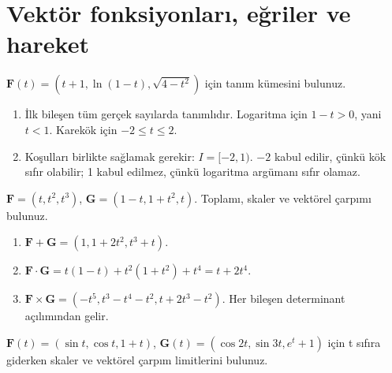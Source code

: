 \clearpage\section{Vektör fonksiyonları, eğriler ve hareket}
\begin{tcolorbox}[title={Örnek 3.1 | Defterdeki tanım kümesi örneği},colframe=accent]\(\mathbf F(t)=(t+1,\ln(1-t),\sqrt{4-t^2})\) için tanım kümesini bulunuz.
\par{}\end{tcolorbox}
\begin{tcolorbox}[title={Adım adım çözüm},colback=green!3!white,colframe=green]\begin{enumerate}
\item İlk bileşen tüm gerçek sayılarda tanımlıdır. Logaritma için \(1-t>0\), yani \(t<1\). Karekök için \(-2\le t\le2\).
\item Koşulları birlikte sağlamak gerekir: \(I=[-2,1)\). \(-2\) kabul edilir, çünkü kök sıfır olabilir; 1 kabul edilmez, çünkü logaritma argümanı sıfır olamaz.
\end{enumerate}\end{tcolorbox}
\begin{tcolorbox}[title={Örnek 3.2 | Vektör fonksiyonlarıyla işlemler},colframe=accent]\(\mathbf F=(t,t^2,t^3)\), \(\mathbf G=(1-t,1+t^2,t)\). Toplamı, skaler ve vektörel çarpımı bulunuz.
\par{}\end{tcolorbox}
\begin{tcolorbox}[title={Adım adım çözüm},colback=green!3!white,colframe=green]\begin{enumerate}
\item \(\mathbf F+\mathbf G=(1,1+2t^2,t^3+t)\).
\item \(\mathbf F\cdot\mathbf G=t(1-t)+t^2(1+t^2)+t^4=t+2t^4\).
\item \(\mathbf F\times\mathbf G=(-t^5,t^3-t^4-t^2,t+2t^3-t^2)\). Her bileşen determinant açılımından gelir.
\end{enumerate}\end{tcolorbox}
\begin{tcolorbox}[title={Örnek 3.3 | Defterdeki limit işlemleri},colframe=accent]\(\mathbf F(t)=(\sin t,\cos t,1+t)\), \(\mathbf G(t)=(\cos2t,\sin3t,e^t+1)\) için t sıfıra giderken skaler ve vektörel çarpım limitlerini bulunuz.
\par{}\end{tcolorbox}
